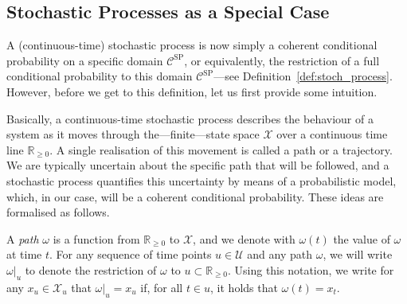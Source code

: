 \documentclass[10pt,a4paper]{paper}
\theoremstyle{definition}
\newcommand{\reals}{\mathbb{R}}
\newcommand{\realsnonneg}{\reals_{\geq 0}}
\newcommand{\states}{\mathcal{X}}
\begin{document}
\subsection{Stochastic Processes as a Special Case}\label{sec:def_stochastic_processes}

A (continuous-time) stochastic process is now simply a coherent conditional probability on a specific domain $\mathcal{C}^\mathrm{SP}$, or equivalently, the restriction of a full conditional probability to this domain $\mathcal{C}^\mathrm{SP}$---see Definition~\ref{def:stoch_process}. However, before we get to this definition, let us first provide some intuition.



Basically, a continuous-time stochastic process describes the behaviour of a system as it moves through the---finite---state space $\states$ over a continuous time line $\realsnonneg$. A single realisation of this movement is called a path or a trajectory. We are typically uncertain about the specific path that will be followed, and a stochastic process quantifies this uncertainty by means of a probabilistic model, which, in our case, will be a coherent conditional probability. These ideas are formalised as follows.


A \emph{path} $\omega$ is a function from $\realsnonneg$ to $\states$, and we denote with $\omega(t)$ the value of $\omega$ at time $t$. For any sequence of time points $u\in\mathcal{U}$ and any path $\omega$, we will write $\omega\vert_{u}$ to denote the restriction of $\omega$ to $u\subset\realsnonneg$. Using this notation, we write for any $x_u\in\states_u$ that $\omega\vert_u=x_u$ if, for all $t\in u$, it holds that $\omega(t)=x_{t}$.%
\end{document}
